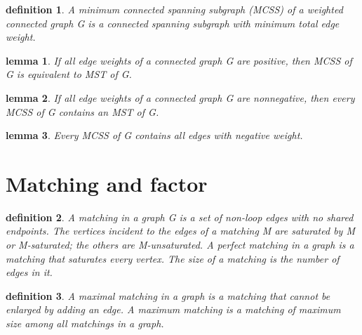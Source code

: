 \documentclass[twocolumn]{article}
\newtheorem{definition}{definition}
\newtheorem{lemma}{lemma}
\begin{document}
\begin{CJK*}{UTF8}{bkai}
    \begin{definition}
         A minimum connected spanning subgraph (MCSS) of a weighted connected
 graph G is a connected spanning subgraph with minimum total edge weight.
    \end{definition}

    \begin{lemma}
        If all edge weights of a connected graph G are positive, then MCSS of G is
 equivalent to MST of G.
    \end{lemma}

    \begin{lemma}
        If all edge weights of a connected graph G are nonnegative, then every MCSS
 of G contains an MST of G.
    \end{lemma}

    \begin{lemma}
         Every MCSS of G contains all edges with negative weight.
    \end{lemma}


\section{Matching and factor}
    \begin{definition}
        A matching in a graph G is a set of non-loop edges with no shared endpoints.
 The vertices incident to the edges of a matching M are saturated by M or
 M-saturated; the others are M-unsaturated. A perfect matching in a graph is
 a matching that saturates every vertex. The size of a matching is the number
 of edges in it.
    \end{definition}

    \begin{definition}
        A maximal matching in a graph is a matching that cannot be enlarged by
 adding an edge. A maximum matching is a matching of maximum size among
 all matchings in a graph.
    \end{definition}


\end{CJK*}
\end{document}
